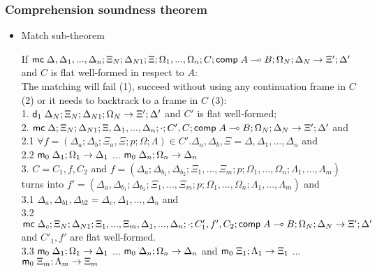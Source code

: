 \subsubsection{Comprehension soundness theorem}

\begin{itemize}
   \item Match sub-theorem

If $\mathsf{mc} \; \Delta, \Delta_1, ..., \Delta_n; \Xi_N; \Delta_{N1}; \Xi; \Omega_1, ..., \Omega_n; C; \mathsf{comp} \; A \multimap B; \Omega_N; \Delta_N \rightarrow \Xi'; \Delta'$  and $C$ is flat well-formed in respect to $A$:\\

The matching will fail (1), succeed without using any continuation frame in $C$ (2) or it needs to backtrack to a frame in $C$ (3):\\
1. \hspace{1cm} $\mathsf{d}_1 \; \Delta_N; \Xi_N; \Delta_{N1}; \Omega_N \rightarrow \Xi'; \Delta'$ and $C'$ is flat well-formed; \\
2. \hspace{1cm} $\mathsf{mc} \; \Delta; \Xi_N; \Delta_{N1}; \Xi, \Delta_1, ..., \Delta_n; \cdot; C', C; \mathsf{comp} \; A \multimap B; \Omega_N; \Delta_N \rightarrow \Xi'; \Delta'$ and\\
2.1 \hspace{2cm} $\forall f = (\Delta_a; \Delta_b; \Xi_a, \Xi; p; \Omega; \Lambda) \in C'. \Delta_a, \Delta_b, \Xi = \Delta, \Delta_1, ..., \Delta_n$ and\\
2.2 \hspace{2cm} $\mathsf{m}_0 \; \Delta_1; \Omega_1 \rightarrow \Delta_1$ ... $\mathsf{m}_0 \; \Delta_n; \Omega_n \rightarrow \Delta_n$\\
3. \hspace{1cm} $C = C_1, f, C_2$ and $f = (\Delta_a; \Delta_{b_1}, \Delta_{b_2}; \Xi_1, ..., \Xi_m; p; \Omega_1, ..., \Omega_n; \Lambda_1, ..., \Lambda_m)$ turns into $f' = (\Delta_a, \Delta_{b_1}; \Delta_{b_2}; \Xi_1, ..., \Xi_m; p; \Omega_1, ..., \Omega_n; \Lambda_1, ..., \Lambda_m)$ and\\
3.1 \hspace{2cm} $\Delta_a, \Delta_{b1}, \Delta_{b2} = \Delta_c, \Delta_1, ..., \Delta_n$ and \\
3.2 \hspace{2cm} $\mathsf{mc} \; \Delta_c; \Xi_N; \Delta_{N1}; \Xi_1, ..., \Xi_m, \Delta_1, ..., \Delta_n; \cdot; C'_1, f', C_2; \mathsf{comp} \; A \multimap B; \Omega_N; \Delta_N \rightarrow \Xi'; \Delta'$ and $C'_1, f'$ are flat well-formed. \\
3.3 \hspace{2cm} $\mathsf{m}_0 \; \Delta_1; \Omega_1 \rightarrow \Delta_1$ ... $\mathsf{m}_0 \; \Delta_n; \Omega_n \rightarrow \Delta_n$ and $\mathsf{m}_0 \; \Xi_1; \Lambda_1 \rightarrow \Xi_1$ ... $\mathsf{m}_0 \; \Xi_m; \Lambda_m \rightarrow \Xi_m$\\


\end{itemize}
